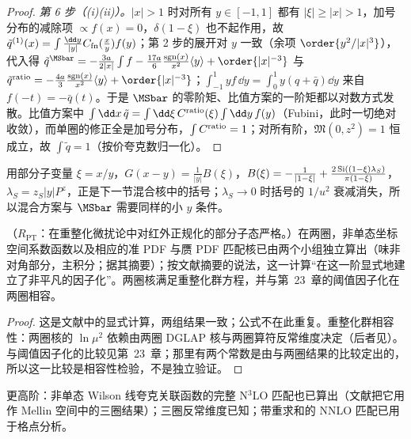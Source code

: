 \begin{proof}
\emph{第 6 步（(i)(ii)）。}$|x|>1$ 时对所有 $y\in[-1,1]$ 都有 $|\xi|\ge|x|>1$，加号分布的减除项 $\propto f(x)=0$，$\delta(1-\xi)$ 也不起作用，故 $\tilde q^{(1)}(x)=\int\frac{\dd y}{|y|}C_{\rm fn}(\frac xy)f(y)$；第 2 步的展开对 $y$ 一致（余项 $\order{y^2/|x|^3}$），代入得 $\tilde q^{\MSbar}=-\frac{3a}{2|x|}\int f-\frac{17a}6\frac{{\rm sgn}(x)}{x^2}\langle y\rangle+\order{|x|^{-3}}$ 与 $\tilde q^{\rm ratio}=-\frac{4a}3\frac{{\rm sgn}(x)}{x^2}\langle y\rangle+\order{|x|^{-3}}$；$\int_{-1}^1yf\,\dd y=\int_0^1y(q+\bar q)\dd y$ 来自 $f(-t)=-\bar q(t)$。于是 $\MSbar$ 的零阶矩、比值方案的一阶矩都以对数方式发散。比值方案中 $\int\dd x\,\tilde q=\int\dd\xi\,C^{\rm ratio}(\xi)\int\dd y\,f(y)$（Fubini，此时一切绝对收敛），而单圈的修正全是加号分布，$\int C^{\rm ratio}=1$；对所有阶，$\mathfrak M(0,z^2)=1$ 恒成立，故 $\int\tilde q=1$（按价夸克数归一化）。
\end{proof}

用部分子变量 $\xi=x/y$，$G(x-y)=\frac1{|y|}B(\xi)$，$B(\xi)=-\frac1{|1-\xi|}+\frac{2\,{\rm Si}((1-\xi)\lambda_S)}{\pi(1-\xi)}$，$\lambda_S=z_S|y|P^z$，正是下一节混合核中的括号；$\lambda_S\to0$ 时括号的 $1/u^2$ 衰减消失，所以混合方案与 $\MSbar$ 需要同样的小 $y$ 条件。

\begin{proposition}\label{prop:lamet-twoloop}
（$R_{\mathrm{PT}}$：在重整化微扰论中对红外正规化的部分子态严格。）在两圈，非单态坐标空间系数函数以及相应的准 PDF 与赝 PDF 匹配核已由两个小组独立算出\cite{Li:2020xml,Chen:2020ody}（味非对角部分\cite{Chen:2020arf}，主积分\cite{Chen:2020iqi}；据其摘要）；按文献\cite{Chen:2020ody}摘要的说法，这一计算“在这一阶显式地建立了非平凡的因子化”。两圈核满足重整化群方程，并与第~23~章的阈值因子化在两圈相容。
\end{proposition}

\begin{proof}
这是文献中的显式计算\cite{Li:2020xml,Chen:2020ody}，两组结果一致；公式不在此重复。重整化群相容性：两圈核的 $\ln\mu^2$ 依赖由两圈 DGLAP 核与两圈算符反常维度决定（后者见\cite{Braun:2020ymy}）。与阈值因子化的比较见第~23~章；那里有两个常数是由与两圈结果的比较定出的，所以这一比较是相容性检验，不是独立验证。
\end{proof}

更高阶：非单态 Wilson 线夸克关联函数的完整 N$^3$LO 匹配也已算出\cite{Cheng:2024wyu}（文献\cite{Ji:2024hit}把它用作 Mellin 空间中的三圈结果）；三圈反常维度已知\cite{Braun:2020ymy}；带重求和的 NNLO 匹配已用于格点分析\cite{Gao:2021dbh,Su:2022fiu}。

